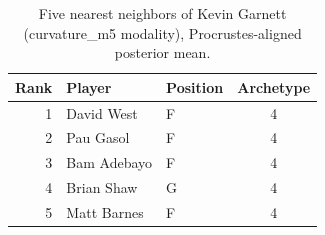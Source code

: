 \begin{table}[htbp]
  \centering\small
  \begin{tabular}{rllc}
    \toprule
    Rank & Player & Position & Archetype \\
    \midrule
    1 & David West & F & 4 \\
    2 & Pau Gasol & F & 4 \\
    3 & Bam Adebayo & F & 4 \\
    4 & Brian Shaw & G & 4 \\
    5 & Matt Barnes & F & 4 \\
    \bottomrule
  \end{tabular}
  \caption{Five nearest neighbors of Kevin Garnett (curvature_m5 modality), Procrustes-aligned posterior mean.}
  \label{tab:Kevin_Garnett_neighbors_curvature_m5}
\end{table}

